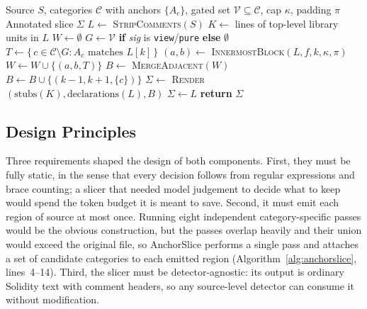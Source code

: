 \documentclass{ieeeaccess}
\begin{document}
\begin{algorithm}[t]
\caption{AnchorSlice}
\label{alg:anchorslice}
\begin{algorithmic}[1]
\REQUIRE Source $S$, categories $\mathcal{C}$ with anchors $\{A_c\}$, gated set $\mathcal{V}\subseteq\mathcal{C}$, cap $\kappa$, padding $\pi$
\ENSURE Annotated slice $\Sigma$
\STATE $L \leftarrow$ \textsc{StripComments}$(S)$
\STATE $K \leftarrow$ lines of top-level library units in $L$ 
\STATE $W \leftarrow \emptyset$
    \STATE $G \leftarrow \mathcal{V}$ \textbf{if} \textit{sig} is \texttt{view}/\texttt{pure} \textbf{else} $\emptyset$
        \STATE $T \leftarrow \{\, c \in \mathcal{C}\setminus G : A_c \text{ matches } L[k] \,\}$
            \STATE $(a,b) \leftarrow$ \textsc{InnermostBlock}$(L,f,k,\kappa,\pi)$
            \STATE $W \leftarrow W \cup \{(a,b,T)\}$
        \ENDIF
    \ENDFOR
\ENDFOR
\STATE $B \leftarrow$ \textsc{MergeAdjacent}$(W)$ 
        \STATE $B \leftarrow B \cup \{(k-1,k+1,\{c\})\}$ 
    \ENDIF
\ENDFOR
\STATE $\Sigma \leftarrow$ \textsc{Render}$(\text{stubs}(K), \text{declarations}(L), B)$
    \STATE $\Sigma \leftarrow L$ 
\ENDIF
\STATE \textbf{return} $\Sigma$
\end{algorithmic}
\end{algorithm}

\subsection{Design Principles}\label{subsec:design}
Three requirements shaped the design of both components. First, they must be fully static, in the sense that every decision follows from regular expressions and brace counting; a slicer that needed model judgement to decide what to keep would spend the token budget it is meant to save. Second, it must emit each region of source at most once. Running eight independent category-specific passes would be the obvious construction, but the passes overlap heavily and their union would exceed the original file, so AnchorSlice performs a single pass and attaches a set of candidate categories to each emitted region (Algorithm~\ref{alg:anchorslice}, lines~4--14). Third, the slicer must be detector-agnostic: its output is ordinary Solidity text with comment headers, so any source-level detector can consume it without modification.
\end{document}

